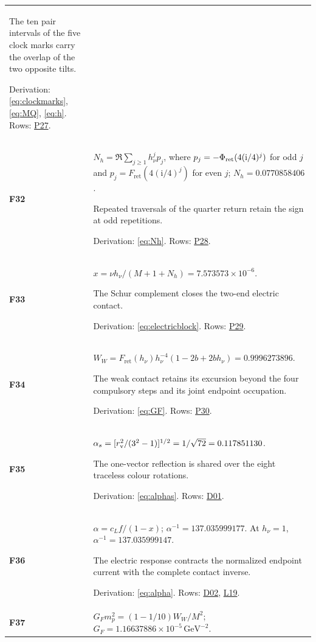 \documentclass[aps,prx,onecolumn,10pt,notitlepage,nofootinbib,longbibliography]{revtex4-2}
\numberwithin{equation}{section}
\numberwithin{table}{section}
\newcommand{\ii}{\mathrm i}
\newcommand{\Fret}{F_{\mathrm{ret}}}
\newcommand{\Phis}{\Phi_{\rm ret}}
\begin{document}
\begin{longtable}{@{}>{\raggedright\arraybackslash}p{}>{\raggedright\arraybackslash}p{}@{}}
The ten pair intervals of the five clock marks carry the overlap of the two opposite tilts.\par
Derivation: \eqref{eq:clockmarks}, \eqref{eq:MQ}, \eqref{eq:h}. Rows: \hyperlink{row-P27}{P27}.\\[7pt]
\hypertarget{formula-F32}{}\textbf{F32}\label{formula:F32} & $N_h=\Re\sum_{j\geq1}h_\nu^jp_j$, where $p_j=-\Phis(4(\ii/4)^j)$ for odd $j$ and $p_j=\Fret(4(\ii/4)^j)$ for even $j$; $N_h=0.0770858406$.\par
Repeated traversals of the quarter return retain the sign at odd repetitions.\par
Derivation: \eqref{eq:Nh}. Rows: \hyperlink{row-P28}{P28}.\\[7pt]
\hypertarget{formula-F33}{}\textbf{F33}\label{formula:F33} & $x=\nu h_\nu/(M+1+N_h)=7.573573\times10^{-6}$.\par
The Schur complement closes the two-end electric contact.\par
Derivation: \eqref{eq:electricblock}. Rows: \hyperlink{row-P29}{P29}.\\[7pt]
\hypertarget{formula-F34}{}\textbf{F34}\label{formula:F34} & $W_W=\Fret(h_\nu)h_\nu^{-4}(1-2b+2bh_\nu)=0.9996273896$.\par
The weak contact retains its excursion beyond the four compulsory steps and its joint endpoint occupation.\par
Derivation: \eqref{eq:GF}. Rows: \hyperlink{row-P30}{P30}.\\[7pt]
\hypertarget{formula-F35}{}\textbf{F35}\label{formula:F35} & $\alpha_s=[r_{\rm v}^2/(3^2-1)]^{1/2}=1/\sqrt{72}=0.117851130$.\par
The one-vector reflection is shared over the eight traceless colour rotations.\par
Derivation: \eqref{eq:alphas}. Rows: \hyperlink{row-D01}{D01}.\\[7pt]
\hypertarget{formula-F36}{}\textbf{F36}\label{formula:F36} & $\alpha=c_Lf/(1-x)$; $\alpha^{-1}=137.035999177$. At $h_\nu=1$, $\alpha^{-1}=137.035999147$.\par
The electric response contracts the normalized endpoint current with the complete contact inverse.\par
Derivation: \eqref{eq:alpha}. Rows: \hyperlink{row-D02}{D02}, \hyperlink{row-L19}{L19}.\\[7pt]
\hypertarget{formula-F37}{}\textbf{F37}\label{formula:F37} & $G_Fm_p^2=(1-1/10)W_W/M^2$; $G_F=1.16637886\times10^{-5}\,\mathrm{GeV}^{-2}$.\par

\end{longtable}
\end{document}

